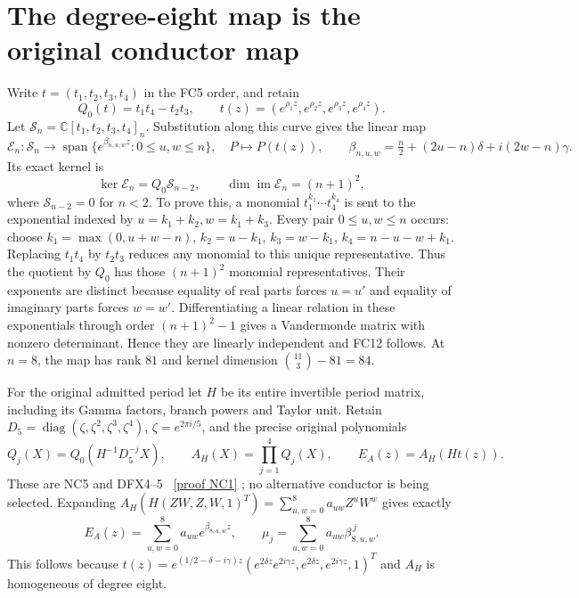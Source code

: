 \documentclass[11pt]{article}
\newcommand{\C}{\mathbb C}
\newcommand{\diag}{\operatorname{diag}}
\begin{document}
\section{The degree-eight map is the original conductor map}
Write $t=(t_1,t_2,t_3,t_4)$ in the FC5 order, and retain
\[
 Q_0(t)=t_1t_4-t_2t_3,\qquad
 t(z)=(e^{\rho_1z},e^{\rho_2z},e^{\rho_3z},e^{\rho_4z}).
 \tag{FC10}
\]
Let $\mathcal S_n=\C[t_1,t_2,t_3,t_4]_n$. Substitution along this
curve gives the linear map
\[
 \mathcal E_n:\mathcal S_n\to
 \operatorname{span}\{e^{\beta_{n,u,w}z}:0\le u,w\le n\},
 \quad P\mapsto P(t(z)),\qquad
 \beta_{n,u,w}=\tfrac n2+(2u-n)\delta+i(2w-n)\gamma.
 \tag{FC11}
\]
Its exact kernel is
\[
 \ker\mathcal E_n=Q_0\mathcal S_{n-2},\qquad
 \dim\operatorname{im}\mathcal E_n=(n+1)^2,
 \tag{FC12}
\]
where $\mathcal S_{n-2}=0$ for $n<2$.
To prove this, a monomial $t_1^{k_1}\cdots t_4^{k_4}$ is sent to the
exponential indexed by $u=k_1+k_2,w=k_1+k_3$. Every pair $0\le u,w\le n$
occurs: choose
$k_1=\max(0,u+w-n)$, $k_2=u-k_1$, $k_3=w-k_1$,
$k_4=n-u-w+k_1$. Replacing $t_1t_4$ by $t_2t_3$ reduces any monomial to
this unique representative. Thus the quotient by $Q_0$ has those
$(n+1)^2$ monomial representatives. Their exponents are distinct because
equality of real parts forces $u=u'$ and equality of imaginary parts
forces $w=w'$. Differentiating a linear relation in these exponentials
through order $(n+1)^2-1$ gives a Vandermonde matrix with nonzero
determinant. Hence they are linearly independent and FC12 follows.
At $n=8$, the map has rank $81$ and kernel dimension
$\binom{11}{3}-81=84$.

For the original admitted period let $H$ be its entire invertible period
matrix, including its Gamma factors, branch powers and Taylor unit.
Retain $D_5=\diag(\zeta,\zeta^2,\zeta^3,\zeta^4)$,
$\zeta=e^{2\pi i/5}$, and the precise original polynomials
\[
 Q_j(X)=Q_0(H^{-1}D_5^{-j}X),\qquad
 A_H(X)=\prod_{j=1}^4Q_j(X),\qquad
 E_A(z)=A_H(Ht(z)).
 \tag{FC13}
\]
These are NC5 and DFX4--5 \cite{NC,Cumulative}%
~\href{https://github.com/KokunoYumeto/zeta-function-research-reader/blob/5992ad50c0f2a06921f1fcaded7b4e38097c0739/workbenches/splitzero-tandem/continuations/20260920-original-kernel-mixed-determinants/providers/ORIGINAL_CONDUCTOR_COPRIMALITY.tex\#L41}{[proof NC1]}%
{}; no alternative conductor
is being selected. Expanding
$A_H(H(ZW,Z,W,1)^T)=\sum_{u,w=0}^8 a_{uw}Z^uW^w$ gives exactly
\[
 E_A(z)=\sum_{u,w=0}^8a_{uw}e^{\beta_{8,u,w}z},\qquad
 \mu_j=\sum_{u,w=0}^8a_{uw}\beta_{8,u,w}^{\,j}.
 \tag{FC14}
\]
This follows because
$t(z)=e^{(1/2-\delta-i\gamma)z}
(e^{2\delta z}e^{2i\gamma z},e^{2\delta z},e^{2i\gamma z},1)^T$
and $A_H$ is homogeneous of degree eight.
\end{document}
